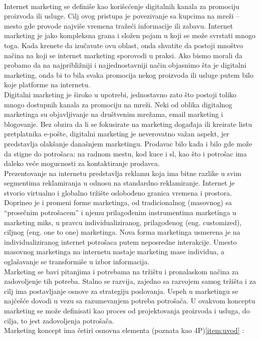 \documentclass[a4paper]{article}
\begin{document}
{\\Internet marketing se definiše kao korišcćenje digitalnih kanala za promociju proizvoda ili usluge. Cilj ovog pristupa je povezivanje sa kupcima na mreži – mesto gde provode najviše vremena tražeći informacije ili zabavu. Internet marketing je jako kompleksna grana i složen pojam u koji se može svrstati mnogo toga. Kada krenete da izučavate ovu oblast, onda shvatite da postoji mnoštvo načina na koji se internet marketing sporovodi u praksi. Ako bismo morali da probamo da na najpribližniji i najjednostavniji način objasnimo šta je digitalni marketing, onda bi to bila svaka promocija nekog proizvoda ili usluge putem bilo koje platforme na internetu.
\\ Digitalni marketing je široko u upotrebi, jednostavno zato što postoji toliko mnogo dostupnih kanala za promociju na mreži. Neki od oblika digitalnog marketinga su objavljivanje na društvenim mrežama, email marketing i blogovanje. Bez obzira da li se fokusirate na marketing događaja ili kreirate listu pretplatnika e-pošte, digitalni marketing je neverovatno važan aspekt, jer predstavlja olakšanje današnjem marketingu. Prodavac bilo kada i bilo gde može da stigne do potrošaca: na radnom mestu, kod kuce i sl, kao što i potrošac ima daleko veće mogucnosti za kontaktiranje prodavca.
\\ Prezentovanje na internetu predstavlja reklamu koja ima bitne razlike u svim segmentima reklamiranja u odnosu na standardno reklamiranje.
Internet je stvorio virtualno i globalno tržište oslobođeno granica vremena i prostora. Doprineo je i promeni forme marketinga, od tradicionalnog (masovnog) sa “prosečnim potrošacem” i njemu prilagođenim instrumentima marketinga u marketing miks, u pravcu individualiziranog, prilagođenog (eng. customized), ciljnog (eng. one to one) marketinga. Nova forma marketinga usmerena je na individualiziranog internet potrošaca putem neposredne interakcije. Umesto masovnog marketinga na internetu nastaje marketing mase individua, a oglašavanje se transformiše u izbor informacija.
\\ Marketing se bavi pitanjima i potrebama na tržištu i pronalaskom načina za zadovoljenje tih potreba. Stalno se razvija, zajedno sa razvojem samog tržišta i za cilj ima postavljanje osnove za strategiju poslovanja. Uspeh u marketingu se najčešće dovodi u vezu sa razumevanjem potreba potrošača. U ovakvom konceptu marketing se može definisati kao proces od projektovanja proizvoda i usluga, do cilja, to jest zadovoljenja potrošača.
\\Marketing koncept ima četiri osnovna elementa (poznata kao 4P)\ref{item:uvod} :
}
\end{document}
